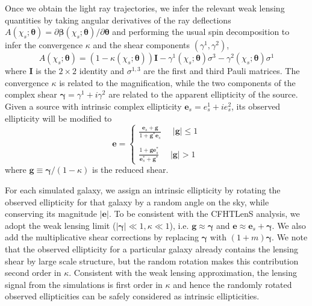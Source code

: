 \documentclass[reprint,aps,prd,superscriptaddress,showkeys,showpacs]{revtex4-1}
\begin{document}
Once we obtain the light ray trajectories, we infer the relevant weak
lensing quantities by taking angular derivatives of the ray
deflections $A(\chi_s;\pmb{\theta}) = \partial
\pmb{\beta}(\chi_s;\pmb{\theta})/\partial\pmb{\theta}$ and performing
the usual spin decomposition to infer the convergence $\kappa$ and the
shear components $(\gamma^1,\gamma^2)$,
%
%
\begin{equation}
A(\chi_s;\pmb{\theta}) = (1-\kappa(\chi_s;\pmb{\theta}))\pmb{I} - \gamma^1(\chi_s;\pmb{\theta})\sigma^3 - \gamma^2(\chi_s;\pmb{\theta})\sigma^1
\end{equation}  
%
where $\pmb{I}$ is the $2\times2$ identity and $\sigma^{1,3}$ are the
first and third Pauli matrices. The convergence $\kappa$ is related to
the magnification, while the two components of the complex shear
$\pmb{\gamma}=\gamma^1 + i\gamma^2$ are related to the apparent
ellipticity of the source. Given a source with intrinsic complex
ellipticity $\mathbf{e}_s=e^1_s + ie^2_s$, its observed ellipticity
will be modified to
%
\begin{equation}
\mathbf{e} = 
\begin{cases}
\frac{\mathbf{e}_s+\mathbf{g}}{1+\mathbf{g}^*\mathbf{e}_s} \,\,\,\,\,\,\,\, \vert \mathbf{g}\vert \leq 1 \\ \\
\frac{1+\mathbf{ge}_s^*}{\mathbf{e}_s^* + \mathbf{g}^*} \,\,\,\,\,\,\,\, \vert \mathbf{g}\vert > 1
\end{cases}
\end{equation}
%
where $\mathbf{g} \equiv \pmb{\gamma}/(1-\kappa)$ is the reduced shear. 

For each simulated galaxy, we assign an intrinsic ellipticity by
rotating the observed ellipticity for that galaxy by a random angle on
the sky, while conserving its magnitude $\vert\mathbf{e}\vert$. To be
consistent with the CFHTLenS analysis, we adopt the weak lensing limit
($\vert\pmb{\gamma}\vert\ll1,\kappa\ll1$), i.e.
$\mathbf{g}\approx\pmb{\gamma}$ and $\mathbf{e}\approx
\mathbf{e}_s+\pmb{\gamma}$. We also add the multiplicative shear
corrections by replacing $\pmb{\gamma}$ with $(1+m)\pmb{\gamma}$. We
note that the observed ellipticity for a particular galaxy already
contains the lensing shear by large scale structure, but the random
rotation makes this contribution second order in $\kappa$. Consistent
with the weak lensing approximation, the lensing signal from the
simulations is first order in $\kappa$ and hence the randomly rotated
observed ellipticities can be safely considered as intrinsic
ellipticities. 
\end{document}
